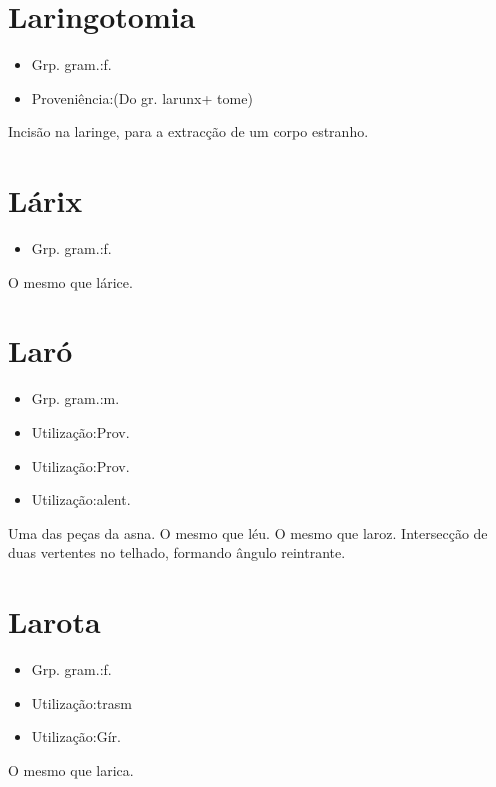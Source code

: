 \section{Laringotomia}
\begin{itemize}
\item {Grp. gram.:f.}
\end{itemize}
\begin{itemize}
\item {Proveniência:(Do gr. \textunderscore larunx\textunderscore  + \textunderscore tome\textunderscore )}
\end{itemize}
Incisão na laringe, para a extracção de um corpo estranho.
\section{Lárix}
\begin{itemize}
\item {Grp. gram.:f.}
\end{itemize}
O mesmo que \textunderscore lárice\textunderscore .
\section{Laró}
\begin{itemize}
\item {Grp. gram.:m.}
\end{itemize}
\begin{itemize}
\item {Utilização:Prov.}
\end{itemize}
\begin{itemize}
\item {Utilização:Prov.}
\end{itemize}
\begin{itemize}
\item {Utilização:alent.}
\end{itemize}
Uma das peças da asna.
O mesmo que \textunderscore léu\textunderscore .
O mesmo que \textunderscore laroz\textunderscore .
Intersecção de duas vertentes no telhado, formando ângulo reintrante.
\section{Larota}
\begin{itemize}
\item {Grp. gram.:f.}
\end{itemize}
\begin{itemize}
\item {Utilização:trasm}
\end{itemize}
\begin{itemize}
\item {Utilização:Gír.}
\end{itemize}
O mesmo que \textunderscore larica\textunderscore .
